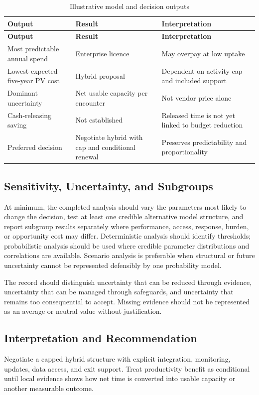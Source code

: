 \begin{longtable}{@{}p{}p{}p{}@{}}
\caption{Illustrative model and decision outputs}
\label{tab:comp-ch06-outputs}\\
\toprule
\textbf{Output} & \textbf{Result} & \textbf{Interpretation} \\
\midrule
\endfirsthead
\toprule
\textbf{Output} & \textbf{Result} & \textbf{Interpretation} \\
\midrule
\endhead
\bottomrule
\endlastfoot
Most predictable annual spend & Enterprise licence & May overpay at low uptake \\
Lowest expected five-year PV cost & Hybrid proposal & Dependent on activity cap and included support \\
Dominant uncertainty & Net usable capacity per encounter & Not vendor price alone \\
Cash-releasing saving & Not established & Released time is not yet linked to budget reduction \\
Preferred decision & Negotiate hybrid with cap and conditional renewal & Preserves predictability and proportionality \\
\end{longtable}

\subsection{Sensitivity, Uncertainty, and Subgroups}
At minimum, the completed analysis should vary the parameters most likely to
change the decision, test at least one credible alternative model structure, and
report subgroup results separately where performance, access, response, burden,
or opportunity cost may differ. Deterministic analysis should identify thresholds;
probabilistic analysis should be used where credible parameter distributions and
correlations are available. Scenario analysis is preferable when structural or
future uncertainty cannot be represented defensibly by one probability model.

The record should distinguish uncertainty that can be reduced through evidence,
uncertainty that can be managed through safeguards, and uncertainty that remains
too consequential to accept. Missing evidence should not be represented as an
average or neutral value without justification.

\subsection{Interpretation and Recommendation}
Negotiate a capped hybrid structure with explicit integration, monitoring, updates, data access, and exit support. Treat productivity benefit as conditional until local evidence shows how net time is converted into usable capacity or another measurable outcome.

